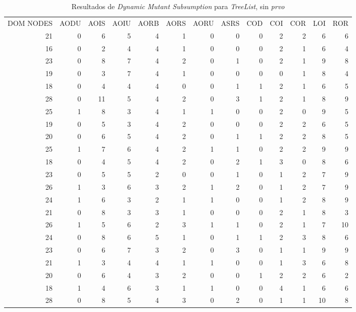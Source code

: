 \begin{table}[]
	\caption{Resultados de \emph{Dynamic Mutant Subsumption} para \emph{TreeList}, sin \emph{prvo}}
	\label{tables.results.subsumption.treelist.noprvo}
	\centering
	\scriptsize
	\def\arraystretch{0.95}
	\setlength\tabcolsep{0.5mm}
	\begin{tabular}{rrrrrrrrrrrrr}
		DOM NODES & AODU & AOIS & AOIU & AORB & AORS & AORU & ASRS & COD & COI & COR & LOI & ROR \\
		21 & 0 & 6 & 5 & 4 & 1 & 0 & 0 & 0 & 2 & 2 & 6 & 6 \\
		16 & 0 & 2 & 4 & 4 & 1 & 0 & 0 & 0 & 2 & 1 & 6 & 4 \\
		23 & 0 & 8 & 7 & 4 & 2 & 0 & 1 & 0 & 2 & 1 & 9 & 8 \\
		19 & 0 & 3 & 7 & 4 & 1 & 0 & 0 & 0 & 0 & 1 & 8 & 4 \\
		18 & 0 & 4 & 4 & 4 & 0 & 0 & 1 & 1 & 2 & 1 & 6 & 5 \\
		28 & 0 & 11 & 5 & 4 & 2 & 0 & 3 & 1 & 2 & 1 & 8 & 9 \\
		25 & 1 & 8 & 3 & 4 & 1 & 1 & 0 & 0 & 2 & 0 & 9 & 5 \\
		19 & 0 & 5 & 3 & 4 & 2 & 0 & 0 & 0 & 2 & 2 & 6 & 5 \\
		20 & 0 & 6 & 5 & 4 & 2 & 0 & 1 & 1 & 2 & 2 & 8 & 5 \\
		25 & 1 & 7 & 6 & 4 & 2 & 1 & 1 & 0 & 2 & 2 & 9 & 9 \\
		18 & 0 & 4 & 5 & 4 & 2 & 0 & 2 & 1 & 3 & 0 & 8 & 6 \\
		23 & 0 & 5 & 5 & 2 & 0 & 0 & 1 & 0 & 1 & 2 & 7 & 9 \\
		26 & 1 & 3 & 6 & 3 & 2 & 1 & 2 & 0 & 1 & 2 & 7 & 9 \\
		24 & 1 & 6 & 3 & 2 & 1 & 1 & 0 & 0 & 1 & 2 & 8 & 9 \\
		21 & 0 & 8 & 3 & 3 & 1 & 0 & 0 & 0 & 2 & 1 & 8 & 3 \\
		26 & 1 & 5 & 6 & 2 & 3 & 1 & 1 & 0 & 2 & 1 & 7 & 10 \\
		24 & 0 & 8 & 6 & 5 & 1 & 0 & 1 & 1 & 2 & 3 & 8 & 6 \\
		23 & 0 & 6 & 7 & 3 & 2 & 0 & 3 & 0 & 1 & 1 & 9 & 9 \\
		21 & 1 & 3 & 4 & 4 & 1 & 1 & 0 & 0 & 1 & 3 & 6 & 8 \\
		20 & 0 & 6 & 4 & 3 & 2 & 0 & 0 & 1 & 2 & 2 & 6 & 2 \\
		18 & 1 & 4 & 6 & 3 & 1 & 1 & 0 & 0 & 4 & 1 & 6 & 6 \\
		28 & 0 & 8 & 5 & 4 & 3 & 0 & 2 & 0 & 1 & 1 & 10 & 8 \\

\end{tabular}
\end{table}
